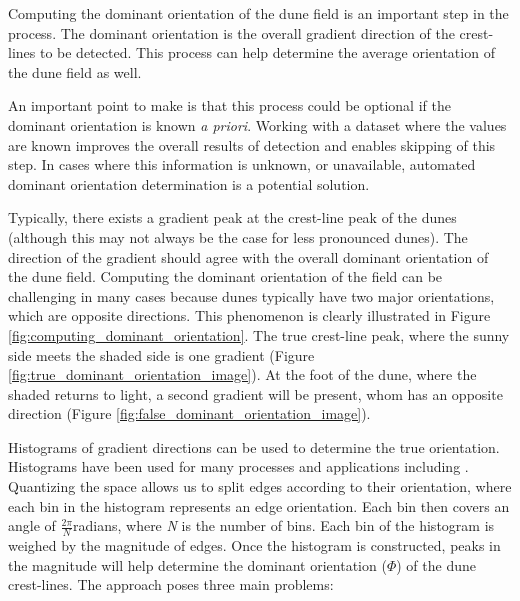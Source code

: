  Computing the dominant orientation of the dune field is an important step in the process. The dominant orientation is the overall gradient direction of the crest-lines to be detected. This process can help determine the average orientation of the dune field as well. 
 
 An important point to make is that this process could be optional if the dominant orientation is known \emph{a priori}. Working with a dataset where the values are known improves the overall results of detection and enables skipping of this step. In cases where this information is unknown, or unavailable, automated dominant orientation determination is a potential solution.
 
 Typically, there exists a gradient peak at the crest-line peak of the dunes (although this may not always be the case for less pronounced dunes). The direction of the gradient should agree with the overall dominant orientation of the dune field. Computing the dominant orientation of the field can be challenging in many cases because dunes typically have two major orientations, which are opposite directions. This phenomenon is clearly illustrated in Figure \ref{fig:computing_dominant_orientation}. The true crest-line peak, where the sunny side meets the shaded side is one gradient (Figure \ref{fig:true_dominant_orientation_image}). At the foot of the dune, where the shaded returns to light, a second gradient will be present, whom has an opposite direction (Figure \ref{fig:false_dominant_orientation_image}).
 
 Histograms of gradient directions can be used to determine the true orientation. Histograms have been used for many processes and applications including \cite{lowe_sift_paper, dalal_histogram_oriented_gradients_human_detection, hu_gradient_field_descriptor}. Quantizing the space allows us to split edges according to their orientation, where each bin in the histogram represents an edge orientation. Each bin then covers an angle of $\frac{2\pi}{N}$radians, where \emph{N} is the number of bins. Each bin of the histogram is weighed by the magnitude of edges. Once the histogram is constructed, peaks in the magnitude will help determine the dominant orientation ($\varPhi$) of the dune crest-lines. The approach poses three main problems:
  
